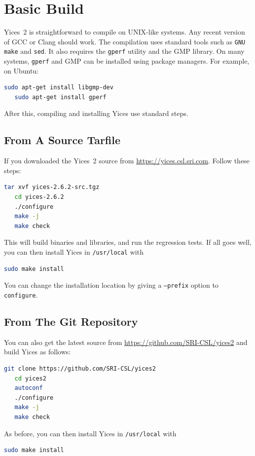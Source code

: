 \documentclass[11pt,twoside,fleqn,openright,titlepage]{cslreport}
\begin{document}
\section{Basic Build}

Yices~2 is straightforward to compile on UNIX-like systems. Any recent
version of GCC or Clang should work. The compilation uses standard
tools such as \texttt{GNU make} and \texttt{sed}. It also requires the
\texttt{gperf} utility and the GMP library. On many systems,
\texttt{gperf} and GMP can be installed using package
managers.  For example, on Ubuntu:
\begin{small}
\begin{lstlisting}[language=sh]
   sudo apt-get install libgmp-dev
   sudo apt-get install gperf
\end{lstlisting}
\end{small}
After this, compiling and installing Yices use standard steps.

\subsection*{From A Source Tarfile}

If you downloaded the Yices~2 source from \url{https://yices.csl.sri.com}. Follow these steps:
\begin{small}
\begin{lstlisting}[language=sh,deletekeywords={cd}]
   tar xvf yices-2.6.2-src.tgz
   cd yices-2.6.2
   ./configure
   make -j
   make check
\end{lstlisting}
\end{small}
This will build binaries and libraries, and run the regression tests. If all goes well, you can then
install Yices in \texttt{/usr/local} with
\begin{small}
\begin{lstlisting}[language=sh]
   sudo make install
\end{lstlisting}
\end{small}
You can change the installation location by giving a \texttt{--prefix} option
to \texttt{configure}.

\subsection*{From The Git Repository}

You can also get the latest source from \url{https://github.com/SRI-CSL/yices2} and build Yices as follows:
\begin{small}
\begin{lstlisting}[language=sh,deletekeywords={cd}]
   git clone https://github.com/SRI-CSL/yices2
   cd yices2
   autoconf
   ./configure
   make -j
   make check
\end{lstlisting}
\end{small}
As before, you can then install Yices in \texttt{/usr/local} with
\begin{small}
\begin{lstlisting}[language=sh]
   sudo make install
\end{lstlisting}
\end{small}
\end{document}
